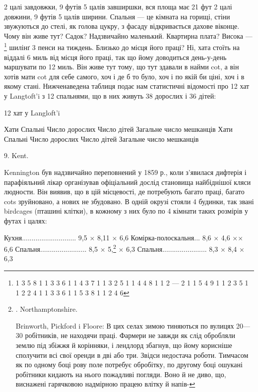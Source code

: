 2 цалі завдовжки, 9 футів 5 цалів завширшки, вся площа має
21 фут 2 цалі довжини, 9 футів 5 цалів ширини. Спальня — це
кімната на горищі, стіни звужуються до стелі, як голова цукру,
з фасаду відкривається дахове віконце. Чому він живе тут?
Садок? Надзвичайно маленький. Квартирна плата? Висока —\footnote{
1    3    5    8    1    1    3    3    6
1    1    4    3    7    1    1    3    2    5
1    1    4    4    8    1    1    2    —   2
1    1    5    4    9    1    1    2    3    5
1    1    2    2    4    1    1    3    3    6
1    1    5    3    8    1    1    2    4    6
} шилінґ 3 пенси на тиждень. Близько до місця його праці?
Ні, хата стоїть на віддалі 6 миль від місця його праці, так що
йому доводиться день-у-день маршувати по 12 миль. Він живе
тут тому, що тут здавали в найми cot, а він хотів мати cot для
себе самого, хоч і де б то було, хоч і по якій би ціні, хоч і в якому
стані. Нижченаведена таблиця подає нам статистичні відомості
про 12 хат у Langtoft’i з 12 спальнями, що в них живуть 38 дорослих
і 36 дітей:

12 хат у Langloft’i

Хати   Спальні  Число дорослих    Число дітей    Загальне число мешканців    Хати    Спальні   
Число дорослих    Число дітей    Загальне число мешканців

9. Kent.

Kennington був надзвичайно переповнений у 1859 р., коли
з’явилася дифтерія і парафіяльний лікар організував офіціальний
дослід становища найбіднішої кляси людности. Він виявив, що
в цій місцевості, де потребують багато праці, багато cots зруйновано,
а нових не збудовано. В одній окрузі стояли 4 будинки,
так звані birdcages (пташині клітки), в кожному з них було по
4 кімнати таких розмірів у футах і цалях:

Кухня............................     9,5 × 8,11 × 6,6
Комірка-полоскальня...      8,6 × 4,6 ×× 6,6
Спальня........................     8,5 × 5,\footnote{
. Northamptonshire.

Brinworth, Pickford i Floore: В цих селах зимою тиняються
по вулицях 20—30 робітників, не находячи праці. Фармери не
завжди як слід обробляли землю під збіжжя й корінняки, і лендлорд
збагнув, що йому корисніше сполучити всі свої оренди
в дві або три. Звідси недостача роботи. Тимчасом як по одному
боці рову поле потребує обробітку, по другому боці ошукані
робітники кидають на нього пожадливі погляди. Воно й не диво,
що, виснажені гарячковою надмірною працею влітку й напів-
} × 6,3
Спальня.......................      8,3 × 8,4 × 6,3